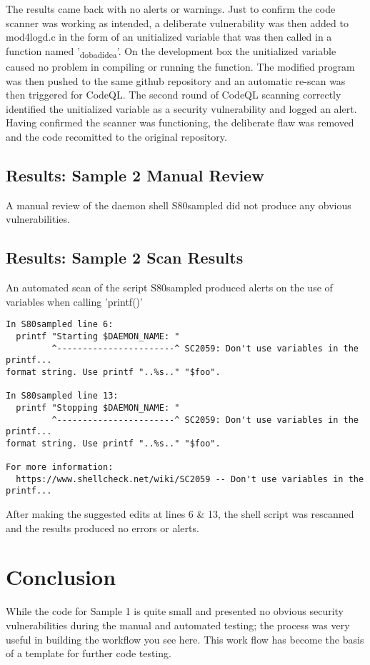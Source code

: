 \documentclass[11pt]{article}
\begin{document}
The results came back with no alerts or warnings.  Just to confirm the code
scanner was working as intended, a deliberate vulnerability was then added to
mod4logd.c in the form of an unitialized variable that was then called in a
function named '\textsubscript{do}\textsubscript{badidea}'.  On the development box the unitialized variable
caused no problem in compiling or running the function.  The modified program
was then pushed to the same github repository and an automatic re-scan was then
triggered for CodeQL.  The second round of CodeQL scanning correctly identified
the unitialized variable as a security vulnerability and logged an alert.
Having confirmed the scanner was functioning, the deliberate flaw was removed
and the code recomitted to the original repository.
\subsection{Results: Sample 2 Manual Review}
\label{sec:org4ecd670}
A manual review of the daemon shell S80sampled did not produce any obvious
vulnerabilities. 
\subsection{Results: Sample 2 Scan Results}
\label{sec:orgf79287a}
An automated scan of the script S80sampled produced alerts on the use of
variables when calling 'printf()'
\label{org516101c}
\begin{verbatim}
In S80sampled line 6:
  printf "Starting $DAEMON_NAME: "
         ^-----------------------^ SC2059: Don't use variables in the printf... 
format string. Use printf "..%s.." "$foo".

In S80sampled line 13:
  printf "Stopping $DAEMON_NAME: "
         ^-----------------------^ SC2059: Don't use variables in the printf...
format string. Use printf "..%s.." "$foo".

For more information:
  https://www.shellcheck.net/wiki/SC2059 -- Don't use variables in the printf...
\end{verbatim}

After making the suggested edits at lines 6 \& 13, the shell script was rescanned
and the results produced no errors or alerts.
\section{Conclusion}
\label{sec:org601c0f5}
While the code for Sample 1 is quite small and presented no obvious security
vulnerabilities during the manual and automated testing; the process was very
useful in building the workflow you see here.  This work flow has become the
basis of a template for further code testing.
\end{document}
